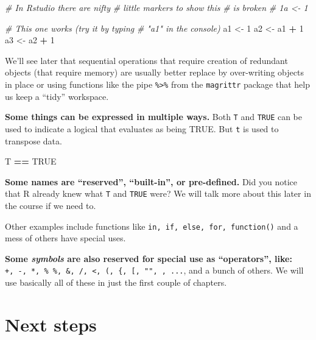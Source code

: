 \documentclass[
]{book}
\newenvironment{Shaded}{\begin{snugshade}}{\end{snugshade}}
\newcommand{\CommentTok}[1]{\textcolor[rgb]{0.56,0.35,0.01}{\textit{#1}}}
\newcommand{\DecValTok}[1]{\textcolor[rgb]{0.00,0.00,0.81}{#1}}
\newcommand{\NormalTok}[1]{#1}
\newcommand{\OperatorTok}[1]{\textcolor[rgb]{0.81,0.36,0.00}{\textbf{#1}}}
\newcommand{\OtherTok}[1]{\textcolor[rgb]{0.56,0.35,0.01}{#1}}
\newcommand{\StringTok}[1]{\textcolor[rgb]{0.31,0.60,0.02}{#1}}
\begin{document}
\begin{Shaded}
\begin{Highlighting}[]
\CommentTok{# In Rstudio there are nifty}
\CommentTok{# little markers to show this}
\CommentTok{# is broken}
\CommentTok{# 1a <- 1}

\CommentTok{# This one works (try it by typing}
\CommentTok{# "a1" in the console)}
\NormalTok{a1 <-}\StringTok{ }\DecValTok{1}
\NormalTok{a2 <-}\StringTok{ }\NormalTok{a1 }\OperatorTok{+}\StringTok{ }\DecValTok{1}
\NormalTok{a3 <-}\StringTok{ }\NormalTok{a2 }\OperatorTok{+}\StringTok{ }\DecValTok{1}
\end{Highlighting}
\end{Shaded}

We'll see later that sequential operations that require creation of redundant objects (that require memory) are usually better replace by over-writing objects in place or using functions like the pipe \texttt{\%\textgreater{}\%} from the \texttt{magrittr} package that help us keep a ``tidy'' workspace.

\textbf{Some things can be expressed in multiple ways.} Both \texttt{T} and \texttt{TRUE} can be used to indicate a logical that evaluates as being TRUE. But \texttt{t} is used to transpose data.

\begin{Shaded}
\begin{Highlighting}[]
\NormalTok{T }\OperatorTok{==}\StringTok{ }\OtherTok{TRUE}
\end{Highlighting}
\end{Shaded}

\textbf{Some names are ``reserved'', ``built-in'', or pre-defined.} Did you notice that R already knew what \texttt{T} and \texttt{TRUE} were? We will talk more about this later in the course if we need to.

Other examples include functions like \texttt{in,\ if,\ else,\ for,\ function()} and a mess of others have special uses.

\textbf{Some \emph{symbols} are also reserved for special use as ``operators'', like:}
\texttt{+,\ -,\ *,\ \%\ \%,\ \&,\ /,\ \textless{},\ (,\ \{,\ {[},\ "",\ \textquotesingle{}\textquotesingle{},\ ...}, and a bunch of others. We will use basically all of these in just the first couple of chapters.

\hypertarget{next1}{%
\section{Next steps}\label{next1}}
\end{document}
